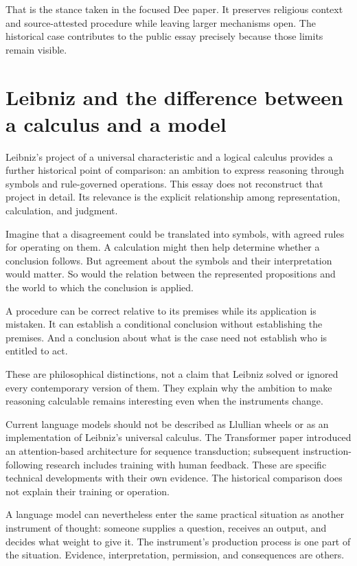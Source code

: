\documentclass[11pt]{article}
\begin{document}
That is the stance taken in the focused Dee paper.\cite{deePaper}
It preserves religious context and source-attested procedure while leaving
larger mechanisms open. The historical case contributes to the public essay
precisely because those limits remain visible.

\section{Leibniz and the difference between a calculus and a model}

Leibniz's project of a universal characteristic and a logical calculus
provides a further historical point of comparison: an ambition to express
reasoning through symbols and rule-governed operations.\cite{leibniz}
This essay does not reconstruct that project in detail. Its relevance is
the explicit relationship among representation, calculation, and judgment.

Imagine that a disagreement could be translated into symbols, with agreed
rules for operating on them. A calculation might then help determine whether
a conclusion follows. But agreement about the symbols and their interpretation
would matter. So would the relation between the represented propositions
and the world to which the conclusion is applied.

A procedure can be correct relative to its premises while its application
is mistaken. It can establish a conditional conclusion without establishing
the premises. And a conclusion about what is the case need not establish
who is entitled to act.

These are philosophical distinctions, not a claim that Leibniz solved
or ignored every contemporary version of them. They explain why the ambition
to make reasoning calculable remains interesting even when the instruments
change.

Current language models should not be described as Llullian wheels or as
an implementation of Leibniz's universal calculus. The Transformer paper
introduced an attention-based architecture for sequence transduction;
subsequent instruction-following research includes training with human
feedback.\cite{vaswani,ouyang}
These are specific technical developments with their own evidence.
The historical comparison does not explain their training or operation.

A language model can nevertheless enter the same practical situation as
another instrument of thought: someone supplies a question, receives an
output, and decides what weight to give it. The instrument's production
process is one part of the situation. Evidence, interpretation, permission,
and consequences are others.
\end{document}
